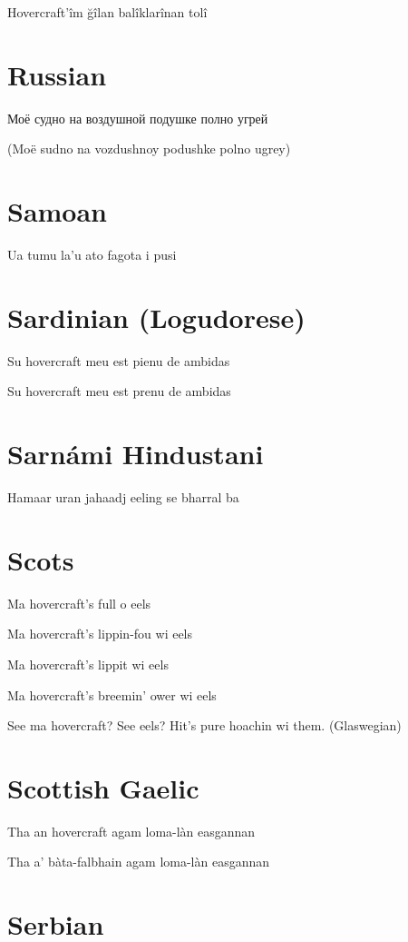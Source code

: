 \documentclass{article}
\newcommand{\freeserif}[1]{{\fontspec{FreeSerif}#1}}
\begin{document}
Hovercraft'îm ğîlan balîklarînan tolî

\section{Russian}

\freeserif{Моё судно на воздушной подушке полно угрей}

\noindent
(Moë sudno na vozdushnoy podushke polno ugrey)

\section{Samoan}

Ua tumu la'u ato fagota i pusi

\section{Sardinian (Logudorese)}

Su hovercraft meu est pienu de ambidas

\noindent
Su hovercraft meu est prenu de ambidas

\section{Sarnámi Hindustani}

Hamaar uran jahaadj eeling se bharral ba

\section{Scots}

Ma hovercraft's full o eels

\noindent
Ma hovercraft's lippin-fou wi eels

\noindent
Ma hovercraft's lippit wi eels

\noindent
Ma hovercraft's breemin' ower wi eels

\noindent
See ma hovercraft? See eels? Hit's pure hoachin wi them. (Glaswegian)

\section{Scottish Gaelic}

Tha an hovercraft agam loma-làn easgannan

\noindent
Tha a' bàta-falbhain agam loma-làn easgannan

\section{Serbian}
\end{document}
